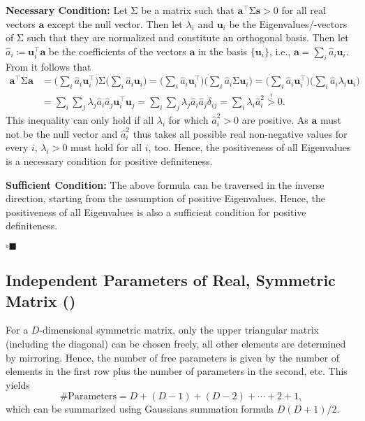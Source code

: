\documentclass[11pt, a4paper]{scrartcl}
\newcommand{\transposed}{{\!\top\!}}
\renewcommand{\vec}[1]{\bm{#1}}
\newcommand{\mat}[1]{\bm{\mathrm{#1}}}
\newcommand{\qedeot}{\hfill\(\square\blacksquare\)}
\newcommand{\diffstar}{\texorpdfstring{\raisebox{-1pt}{\resizebox{!}{8pt}{\(\star\)}}}{*}}
\newcommand{\onestar}  {(\diffstar)}
\begin{document}
			\textbf{Necessary Condition:} Let \(\mat{\Sigma}\) be a matrix such that \( \vec{a}^\transposed \mat{\Sigma} \vec{s} > 0 \) for all real vectors \(\vec{a}\) except the null vector. Then let \( \lambda_i \) and \( \vec{u}_i \) be the Eigenvalues/-vectors of \(\mat{\Sigma}\) such that they are normalized and constitute an orthogonal basis. Then let \( \hat{a}_i \coloneqq \vec{u}_i^\transposed \vec{a} \) be the coefficients of the vectors \(\vec{a}\) in the basis \( \{ \vec{u}_i \} \), i.e., \( \vec{a} = \sum_i \hat{a}_i \vec{u}_i \). From it follows that
			\begin{align}
				\vec{a}^\transposed \mat{\Sigma} \vec{a}
					&= \Bigg(\! \sum_i \hat{a}_i \vec{u}_i^\transposed \Bigg) \mat{\Sigma} \Bigg(\! \sum_i \hat{a}_i \vec{u}_i \!\Bigg)
					 = \Bigg(\! \sum_i \hat{a}_i \vec{u}_i^\transposed \Bigg) \Bigg(\! \sum_i \hat{a}_i \mat{\Sigma} \vec{u}_i \!\Bigg)
					 = \Bigg(\! \sum_i \hat{a}_i \vec{u}_i^\transposed \Bigg) \Bigg(\! \sum_i \hat{a}_i \lambda_i \vec{u}_i \!\Bigg) \\
					&= \sum_i \sum_j \lambda_j \hat{a}_i \hat{a}_j \vec{u}_i^\transposed \vec{u}_j
					 = \sum_i \sum_j \lambda_j \hat{a}_i \hat{a}_j \delta_{ij}
					 = \sum_i \lambda_i \hat{a}_i^2
					 \overset{!}{>} 0.
			\end{align}
			This inequality can only hold if all \( \lambda_i \) for which \( \hat{a}_i^2 > 0 \) are positive. As \( \vec{a} \) must not be the null vector and \( \hat{a}_i^2 \) thus takes all possible real non-negative values for every \(i\), \( \lambda_i > 0 \) must hold for all \(i\), too. Hence, the positiveness of all Eigenvalues is a necessary condition for positive definiteness.

			\textbf{Sufficient Condition:} The above formula can be traversed in the inverse direction, starting from the assumption of positive Eigenvalues. Hence, the positiveness of all Eigenvalues is also a sufficient condition for positive definiteness.

			\qedeot

		\subsection{Independent Parameters of Real, Symmetric Matrix  \onestar}
			For a \(D\)-dimensional symmetric matrix, only the upper triangular matrix (including the diagonal) can be chosen freely, all other elements are determined by mirroring. Hence, the number of free parameters is given by the number of elements in the first row plus the number of parameters in the second, etc. This yields
			\begin{equation}
				\text{\#Parameters} = D + (D - 1) + (D - 2) + \cdots + 2 + 1,
			\end{equation}
			which can be summarized using Gaussians summation formula \( D (D + 1) / 2 \).
\end{document}
